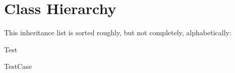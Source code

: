 \section{Class Hierarchy}
This inheritance list is sorted roughly, but not completely, alphabetically\-:\begin{DoxyCompactList}
\item Test\begin{DoxyCompactList}
\item {}
\item {}
\end{DoxyCompactList}
\item Test\-Case\begin{DoxyCompactList}
\item {}
\end{DoxyCompactList}
\end{DoxyCompactList}
